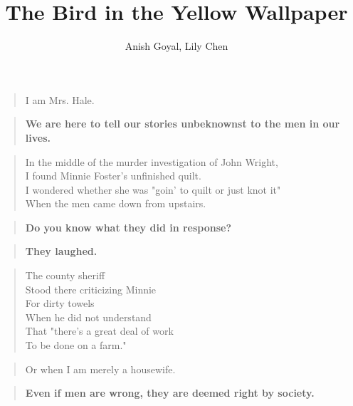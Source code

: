 \documentclass[twocolumn]{article}
\title{The Bird in the Yellow Wallpaper}
\author{Anish Goyal, Lily Chen}
\begin{document}
\maketitle
\onecolumn
\pagebreak
\twocolumn
\begin{verse}
I am Mrs. Hale. \\
\end{verse}

\begin{verse}
\textbf{We are here to tell our stories unbeknownst to the men in our lives.} \\
\end{verse}

\begin{verse}
In the middle of the murder investigation of John Wright, \\
I found Minnie Foster's unfinished quilt. \\
I wondered whether she was "goin' to quilt or just knot it" \\
When the men came down from upstairs. \\
\end{verse}

\begin{verse}
\textbf{Do you know what they did in response?} \\
\end{verse}

\begin{verse}
\textbf{They laughed.} \\
\end{verse}

\begin{verse}
The county sheriff \\ 
Stood there criticizing Minnie \\ 
For dirty towels \\
When he did not understand \\  
That "there's a great deal of work \\ 
To be done on a farm." \\
\end{verse}

\begin{verse}
Or when I am merely a housewife. \\
\end{verse}

\begin{verse}
\textbf{Even if men are wrong, they are deemed right by society.} \\
\end{verse}
\end{document}
